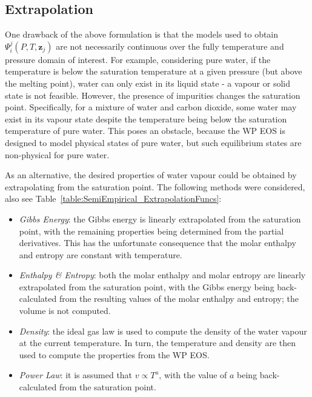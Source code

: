 \subsection{Extrapolation}
\label{sec:extrapolation}
    One drawback of the above formulation is that the models used to obtain \(\Psi_i^j (P, T, \mathbf{z}_j)\) are not necessarily continuous over the fully temperature and pressure domain of interest. For example, considering pure water, if the temperature is below the saturation temperature at a given pressure (but above the melting point), water can only exist in its liquid state - a vapour or solid state is not feasible. However, the presence of impurities changes the saturation point. Specifically, for a mixture of water and carbon dioxide, some water may exist in its vapour state despite the temperature being below the saturation temperature of pure water. This poses an obstacle, because the \ac{WP} \ac{EOS} is designed to model physical states of pure water, but such equilibrium states are non-physical for pure water. 


    As an alternative, the desired properties of water vapour could be obtained by extrapolating from the saturation point. The following methods were considered, also see Table~\ref{table:SemiEmpirical_ExtrapolationFuncs}:

    \begin{itemize}
        \item \emph{Gibbs Energy}: the Gibbs energy is linearly extrapolated from the saturation point, with the remaining properties being determined from the partial derivatives. This has the unfortunate consequence that the molar enthalpy and entropy are constant with temperature.
        \item \emph{Enthalpy \& Entropy}: both the molar enthalpy and molar entropy are linearly extrapolated from the saturation point, with the Gibbs energy being back-calculated from the resulting values of the molar enthalpy and entropy; the volume is not computed.
        \item \emph{Density}: the ideal gas law is used to compute the density of the water vapour at the current temperature. In turn, the temperature and density are then used to compute the properties from the \ac{WP} \ac{EOS}.
        \item \emph{Power Law}: it is assumed that \(v \propto T^a\), with the value of \(a\)  being back-calculated from the saturation point.
    \end{itemize}

